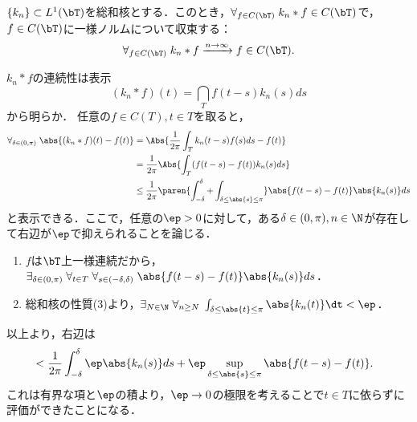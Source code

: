 \documentclass[uplatex,dvipdfmx]{jsreport}
\begin{document}
\begin{theorem}\label{thm-kernel-is-approximate-unit-in-C}
    $\{k_n\}\subset L^1(\bT)$を総和核とする．このとき，$\forall_{f\in C(\bT)}\;k_n*f\in C(\bT)$で，$f\in C(\bT)$に一様ノルムについて収束する：
    \[\forall_{f\in C(\bT)}\;k_n*f\xrightarrow{n\to\infty}f\in C(\bT).\]
\end{theorem}
\begin{Proof}
    $k_n*f$の連続性は表示
    \[(k_n*f)(t)=\dint_Tf(t-s)k_n(s)ds\]
    から明らか．
    任意の$f\in C(T),t\in T$を取ると，
    \begin{align*}
        \forall_{\delta\in(0,\pi)}\;\abs{(k_n*f)(t)-f(t)}&=\Abs{\frac{1}{2\pi}\int_Tk_n(t-s)f(s)ds-f(t)}\\
        &=\frac{1}{2\pi}\Abs{\int_T(f(t-s)-f(t))k_n(s)ds}\\
        &\le\frac{1}{2\pi}\paren{\int^\delta_{-\delta}+\int_{\delta\le\abs{s}\le\pi}}\abs{f(t-s)-f(t)}\abs{k_n(s)}ds
    \end{align*}
    と表示できる．ここで，任意の$\ep>0$に対して，ある$\delta\in(0,\pi),n\in\N$が存在して右辺が$\ep$で抑えられることを論じる．
    \begin{enumerate}
        \item $f$は$\bT$上一様連続だから，$\exists_{\delta\in(0,\pi)}\;\forall_{t\in T}\;\forall_{s\in(-\delta,\delta)}\;\abs{f(t-s)-f(t)}\abs{k_n(s)}ds$．
        \item 総和核の性質(3)より，$\exists_{N\in\N}\;\forall_{n\ge N}\;\int_{\delta\le\abs{t}\le\pi}\abs{k_n(t)}\dt<\ep$．
    \end{enumerate}
    以上より，右辺は
    \begin{align*}
        &<\frac{1}{2\pi}\int^\delta_{-\delta}\ep\abs{k_n(s)}ds+\ep\sup_{\delta\le\abs{s}\le\pi}\abs{f(t-s)-f(t)}.
    \end{align*}
    これは有界な項と$\ep$の積より，$\ep\to0$の極限を考えることで$t\in T$に依らずに評価ができたことになる．
\end{Proof}
\end{document}
